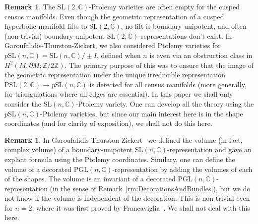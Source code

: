 \documentclass[12pt]{amsart}
\theoremstyle{definition}
\newtheorem{remark}[theorem]{Remark}
\numberwithin{equation}{section}
\def\SL{\mathrm{SL}}
\def\PSL{\mathrm{PSL}}
\def\PGL{\mathrm{PGL}}
\def\GL{\mathrm{GL}}
\def\Z{\mathbb{Z}}
\def\C{\mathbb{C}}
\begin{document}
\begin{remark}\label{rm:ObstructionCocycles}
The $\SL(2,\C)$-Ptolemy varieties are often empty for the cusped census manifolds. Even though the geometric representation of a cusped hyperbolic manifold lifts to $\SL(2,\C)$, no lift is boundary-unipotent, and often (non-trivial) boundary-unipotent $\SL(2,\C)$-representations don't exist.
In Garoufalidis-Thurston-Zickert, we also considered Ptolemy varieties for $p\SL(n,\C)=\SL(n,\C)\big/\pm I$, defined when $n$ is even via an obstruction class in $H^2(M,\partial M;\Z/2\Z)$. The primary purpose of this was to ensure that the image of the geometric representation under the unique irreducible representation $\PSL(2,\C)\to p\SL(n,\C)$ is detected for all census manifolds (more generally, for triangulations where all edges are essential). In this paper we shall only consider the $\SL(n,\C)$-Ptolemy variety. %
One can develop all the theory using the $p\SL(n,\C)$-Ptolemy varieties, but since our main interest here is in the shape coordinates (and for clarity of exposition), we shall not do this here.
\end{remark}

\begin{remark}\label{rm:Volume}
In Garoufalidis-Thurston-Zickert~\cite{GaroufalidisThurstonZickert} we defined the volume (in fact, complex volume) of a boundary-unipotent $\SL(n,\C)$-representation and gave an explicit formula using the Ptolemy coordinates. Similary, one can define the volume of a decorated $\PGL(n,\C)$-representation by adding the volumes of each of the shapes. The volume is an invariant of a decorated $\PGL(n,\C)$-representation (in the sense of Remark~\ref{rm:DecorationsAndBundles}), but we do not know if the volume is independent of the decoration. This is non-trivial even for $n=2$, where it was first proved by Francaviglia~\cite{FrancavigliaVolume}. We shall not deal with this here. 
\end{remark}
\end{document}
